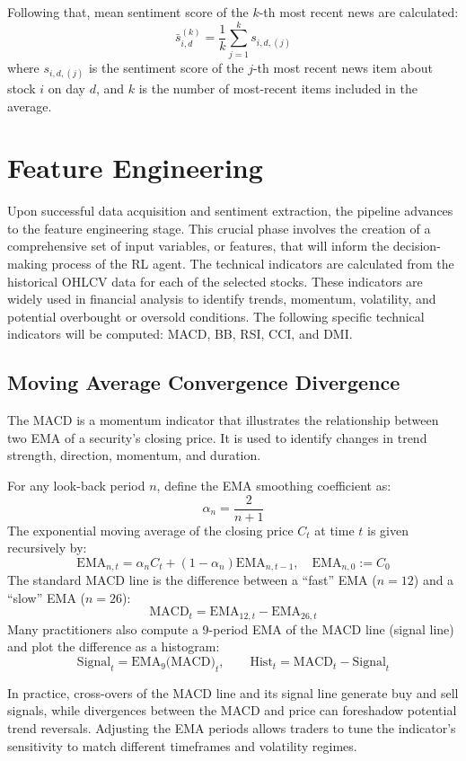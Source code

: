 Following that, mean sentiment score of the \(k\)-th most recent news are calculated:
\[\bar{s}_{i,d}^{(k)} = \frac{1}{k} \sum_{j=1}^{k} s_{i,d,(j)}\]
where \(s_{i,d,(j)}\) is the sentiment score of the \(j\)-th most recent news item about stock \(i\) on day \(d\), and \(k\) is the number of most-recent items included in the average.

\section{Feature Engineering}

Upon successful data acquisition and sentiment extraction, the pipeline advances to the feature engineering stage. This crucial phase involves the creation of a comprehensive set of input variables, or features, that will inform the decision-making process of the \gls{RL} agent. The technical indicators are calculated from the historical \gls{OHLCV} data for each of the selected stocks. These indicators are widely used in financial analysis to identify trends, momentum, volatility, and potential overbought or oversold conditions. The following specific technical indicators will be computed: \gls{MACD}, \gls{BB}, \gls{RSI}, \gls{CCI}, and \gls{DMI}.

\subsection{Moving Average Convergence Divergence}
The \gls{MACD} is a momentum indicator that illustrates the relationship between two \gls{EMA} of a security’s closing price. It is used to identify changes in trend strength, direction, momentum, and duration.

For any look-back period \(n\), define the \gls{EMA} smoothing coefficient as:
\[\alpha_n = \frac{2}{n+1}\]
The exponential moving average of the closing price \(C_t\) at time \(t\) is given recursively by:
\[\mathrm{EMA}_{n,t} = \alpha_n C_t + (1 - \alpha_n) \mathrm{EMA}_{n,t-1} , \quad \mathrm{EMA}_{n,0} := C_0\]
The standard \gls{MACD} line is the difference between a “fast” \gls{EMA} (\(n=12\)) and a “slow” \gls{EMA} (\(n=26\)):
\[\mathrm{MACD}_t = \mathrm{EMA}_{12,t} - \mathrm{EMA}_{26,t}\]
Many practitioners also compute a 9-period \gls{EMA} of the \gls{MACD} line (signal line) and plot the difference as a histogram:
\[\mathrm{Signal}_t = \mathrm{EMA}_{9}\bigl(\mathrm{MACD}\bigr)_t, \qquad \mathrm{Hist}_t = \mathrm{MACD}_t - \mathrm{Signal}_t\]

In practice, cross-overs of the \gls{MACD} line and its signal line generate buy and sell signals, while divergences between the \gls{MACD} and price can foreshadow potential trend reversals. Adjusting the \gls{EMA} periods allows traders to tune the indicator’s sensitivity to match different timeframes and volatility regimes.

